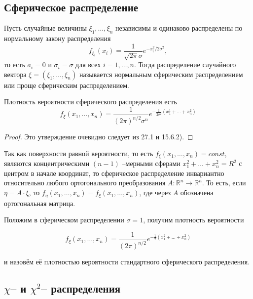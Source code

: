 
\subsection{Сферическое распределение}

\begin{definition}
Пусть случайные величины $\xi_1 , \ldots , \xi_n$ независимы и одинаково распределены по нормальному закону распределения
%
$$f_{\xi_i}(x_i) = \frac{1}{\sqrt{2\pi} \sigma} e^{-x^2_i/2\sigma^2},$$
%
то есть $a_i = 0$ и $\sigma_i = \sigma$ для всех 
%
$i = 1, \ldots , n.$ 
%
Тогда распределение случайного вектора $\xi = (\xi_1 , \ldots , \xi_n )$ называется нормальным сферическим распределением или проще сферическим распределением.
\end{definition}

\begin{lemma}
 Плотность вероятности сферического распределения есть
$$f_{\xi} (x_1 , \ldots , x_n ) = \frac{1}{(2\pi)^{n/2}\sigma^n} e^{-\frac{1}{2\sigma^2}(x_1^1 + \ldots + x^2_n)}$$
 \end{lemma} 

 \begin{proof}
 Это утверждение очевидно следует из 27.1 и 15.6.2).
 \end{proof}

\begin{zam}
Так как поверхности равной вероятности, то есть
$f_{\xi} (x_1 , \ldots , x_n ) = const$,
являются концентрическими $(n - 1)$ --мерными сферами $x^2_1 + \ldots + x^2_n = R^2$ 
с центром в начале координат, то сферическое распределение инвариантно относительно любого ортогонального преобразования
%
$A : \mathbb{R}^n \to \mathbb{R}^n$. 
%
То есть, если $\eta = A \cdot \xi$, то 
%
$f_{\eta}(x_1 , \ldots , x_n) = f_{\xi} (x_1 , \ldots , x_n )$,
%
где через $A$ обозначена ортогональная матрица.

Положим в сферическом распределении $\sigma = 1$, получим плотность вероятности

$$f_{\xi}(x_1, \ldots, x_n) = \frac{1}{(2\pi)^{n/2}}e^{-\frac{1}{2}(x_1^2 + \ldots + x_n^2)} $$

и назовём её плотностью вероятности стандартного сферического распределения.
\end{zam}

\subsection{$\chi$-- и $\chi^2$-- распределения}

